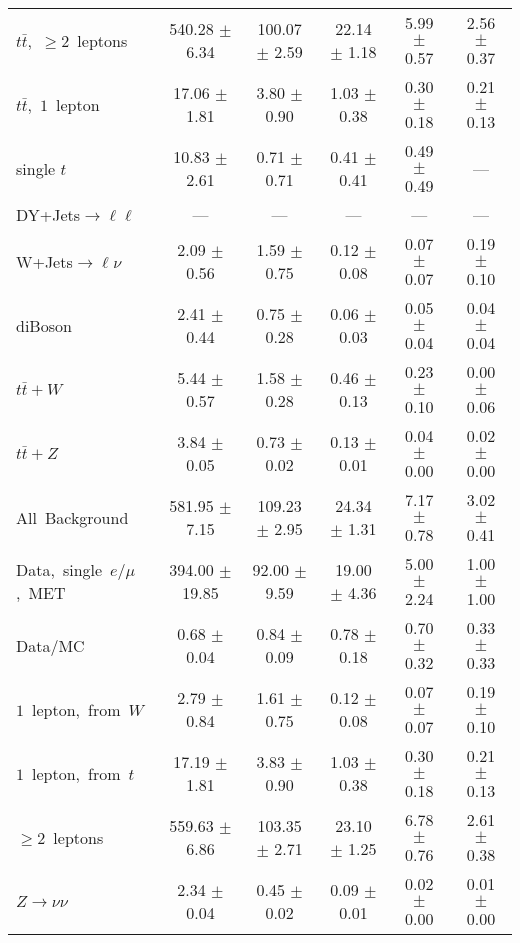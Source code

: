 \documentclass{article}
\begin{document}
\begin{longtable}{|l|c|c|c|c|c|}
$t\bar{t}$,~$\ge2$~leptons & 540.28 $\pm$ 6.34  & 100.07 $\pm$ 2.59  & 22.14 $\pm$ 1.18  & 5.99 $\pm$ 0.57  & 2.56 $\pm$ 0.37 \\* 
$t\bar{t}$,~$1$~lepton & 17.06 $\pm$ 1.81  & 3.80 $\pm$ 0.90  & 1.03 $\pm$ 0.38  & 0.30 $\pm$ 0.18  & 0.21 $\pm$ 0.13 \\* 
single $t$  & 10.83 $\pm$ 2.61  & 0.71 $\pm$ 0.71  & 0.41 $\pm$ 0.41  & 0.49 $\pm$ 0.49  & --- \\* 
DY+Jets$\rightarrow\ell\ell$  & ---  & ---  & ---  & ---  & --- \\* 
W+Jets$\rightarrow\ell\nu$  & 2.09 $\pm$ 0.56  & 1.59 $\pm$ 0.75  & 0.12 $\pm$ 0.08  & 0.07 $\pm$ 0.07  & 0.19 $\pm$ 0.10 \\* 
diBoson  & 2.41 $\pm$ 0.44  & 0.75 $\pm$ 0.28  & 0.06 $\pm$ 0.03  & 0.05 $\pm$ 0.04  & 0.04 $\pm$ 0.04 \\* 
$t\bar{t}+W$  & 5.44 $\pm$ 0.57  & 1.58 $\pm$ 0.28  & 0.46 $\pm$ 0.13  & 0.23 $\pm$ 0.10  & 0.00 $\pm$ 0.06 \\* 
$t\bar{t}+Z$  & 3.84 $\pm$ 0.05  & 0.73 $\pm$ 0.02  & 0.13 $\pm$ 0.01  & 0.04 $\pm$ 0.00  & 0.02 $\pm$ 0.00 \\* 
\hline \hline 
All~Background  & 581.95 $\pm$ 7.15  & 109.23 $\pm$ 2.95  & 24.34 $\pm$ 1.31  & 7.17 $\pm$ 0.78  & 3.02 $\pm$ 0.41 \\* 
Data,~single~$e/\mu$,~MET  & 394.00 $\pm$ 19.85  & 92.00 $\pm$ 9.59  & 19.00 $\pm$ 4.36  & 5.00 $\pm$ 2.24  & 1.00 $\pm$ 1.00 \\* 
Data/MC  & 0.68 $\pm$ 0.04  & 0.84 $\pm$ 0.09  & 0.78 $\pm$ 0.18  & 0.70 $\pm$ 0.32  & 0.33 $\pm$ 0.33 \\* 
\hline \hline 
$1$~lepton,~from~$W$  & 2.79 $\pm$ 0.84  & 1.61 $\pm$ 0.75  & 0.12 $\pm$ 0.08  & 0.07 $\pm$ 0.07  & 0.19 $\pm$ 0.10 \\* 
$1$~lepton,~from~$t$  & 17.19 $\pm$ 1.81  & 3.83 $\pm$ 0.90  & 1.03 $\pm$ 0.38  & 0.30 $\pm$ 0.18  & 0.21 $\pm$ 0.13 \\* 
$\ge2$~leptons  & 559.63 $\pm$ 6.86  & 103.35 $\pm$ 2.71  & 23.10 $\pm$ 1.25  & 6.78 $\pm$ 0.76  & 2.61 $\pm$ 0.38 \\* 
$Z\rightarrow\nu\nu$  & 2.34 $\pm$ 0.04  & 0.45 $\pm$ 0.02  & 0.09 $\pm$ 0.01  & 0.02 $\pm$ 0.00  & 0.01 $\pm$ 0.00 \\* 
\hline 
\end{longtable} 

 
 
 
 
\pagebreak 
\end{document}
